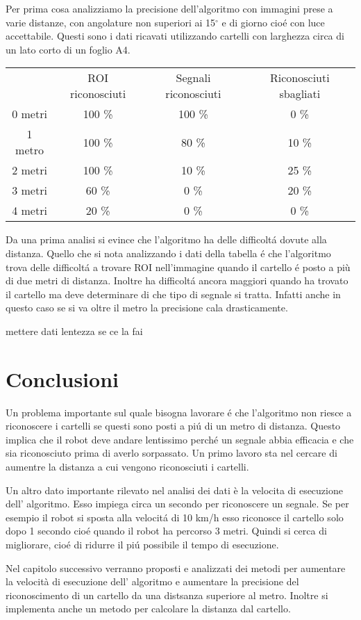 	Per prima cosa analizziamo la precisione dell'algoritmo con immagini prese a varie distanze, con angolature non superiori ai 15$^{\circ}$ e di giorno cio\'e con luce accettabile.
	Questi sono i dati ricavati utilizzando cartelli con larghezza circa di un lato corto di un foglio A4.

	\begin{table}[h]
		\centering
		\begin{tabular}{cccc}
		        & ROI riconosciuti & Segnali riconosciuti & Riconosciuti sbagliati \\
			0 metri & 100 \%                & 100 \%  &	0 \%             \\
			1 metro & 100 \%                & 80 \%   &	10 \%               \\
			2 metri & 100 \%                 & 10 \%  &	25 \%  	            \\
			3 metri & 60 \%                  & 0 \%   &	20 \% 	              \\
			4 metri & 20 \%                  & 0 \%   &	0 \% 	             
		\end{tabular}
	\end{table}

    Da una prima analisi si evince che l'algoritmo ha delle difficolt\'a dovute alla distanza. Quello che si nota analizzando i dati della tabella \'e che l'algoritmo trova delle difficolt\'a a trovare ROI nell'immagine quando il cartello \'e posto a più di due metri di distanza. Inoltre ha difficolt\'a ancora maggiori quando ha trovato il cartello ma deve determinare di che tipo di segnale si tratta. Infatti anche in questo caso se si va oltre il metro la precisione cala drasticamente.

    mettere dati lentezza se ce la fai

\section{Conclusioni}

	Un problema importante sul quale bisogna lavorare \'e che l'algoritmo non riesce a riconoscere i cartelli se questi sono posti a pi\'u di un metro di distanza. Questo implica che il robot deve andare lentissimo perch\'e un segnale abbia efficacia e che sia riconosciuto prima di averlo sorpassato. Un primo lavoro sta nel cercare di aumentre la distanza a cui vengono riconosciuti i cartelli.

	Un altro dato importante rilevato nel analisi dei dati è la velocita di esecuzione dell' algoritmo. Esso impiega circa un secondo per riconoscere un segnale. Se per esempio il robot si sposta alla velocit\'a di 10 km/h esso riconosce il cartello solo dopo 1 secondo cio\'e quando il robot ha percorso 3 metri. Quindi si cerca di migliorare, cio\'e di ridurre il pi\'u possibile il tempo di esecuzione.
	
	Nel capitolo successivo verranno proposti e analizzati dei metodi per aumentare la velocità di esecuzione dell' algoritmo e aumentare la precisione del riconoscimento di un cartello da una distsanza superiore al metro. Inoltre si implementa anche un metodo per calcolare la distanza dal cartello.

	


